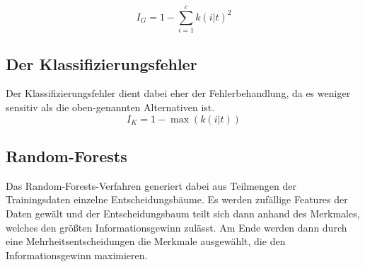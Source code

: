 \documentclass[11pt]{article} %
\begin{document}
\begin{equation}
I_{G} = 1 - \sum_{i = 1}^c k(i|t)^2
\end{equation}

\subsection{Der Klassifizierungsfehler}
Der Klassifizierungsfehler dient dabei eher der Fehlerbehandlung, da es weniger sensitiv als die oben-genannten Alternativen ist.
\begin{equation}
I_{K} = 1 - \max( k(i|t) )
\end{equation}

\subsection{Random-Forests}

Das Random-Forests-Verfahren generiert dabei aus Teilmengen der Trainingsdaten einzelne Entscheidungsbäume. Es werden zufällige Features der Daten gewält und der Entscheidungsbaum teilt sich dann anhand des Merkmales, welches den größten Informationsgewinn zulässt. Am Ende werden dann durch eine Mehrheitsentscheidungen die Merkmale ausgewählt, die den Informationsgewinn maximieren.
\end{document}
